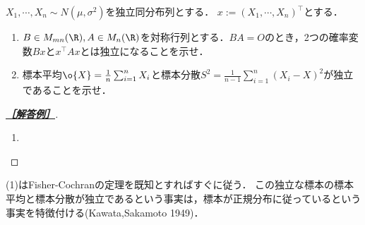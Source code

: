 \documentclass[uplatex,dvipdfmx]{jsarticle}
\begin{document}
\begin{tcolorbox}[colframe=ForestGreen, colback=ForestGreen!10!white,breakable,colbacktitle=ForestGreen!40!white,coltitle=black,fonttitle=\bfseries\sffamily,
    title=第３問]
    $X_1,\cdots,X_n\sim N(\mu,\sigma^2)$を独立同分布列とする．
    $x:=(X_1,\cdots,X_n)^\top$とする．
    \begin{enumerate}
        \item $B\in M_{mn}(\R),A\in M_n(\R)$を対称行列とする．$BA=O$のとき，2つの確率変数$Bx$と$x^\top Ax$とは独立になることを示せ．
        \item 標本平均$\o{X}=\frac{1}{n}\sum_{i=1}^nX_i$と標本分散$S^2=\frac{1}{n-1}\sum_{i=1}^n(X_i-X)^2$が独立であることを示せ．
    \end{enumerate}
\end{tcolorbox}
\begin{proof}[\textbf{\underline{［解答例］}}]\mbox{}
    \begin{enumerate}
        \item 
    \end{enumerate}
\end{proof}
\begin{remarks*}
    (1)はFisher-Cochranの定理を既知とすればすぐに従う．
    この独立な標本の標本平均と標本分散が独立であるという事実は，標本が正規分布に従っているという事実を特徴付ける(Kawata,Sakamoto 1949)．
\end{remarks*}
\end{document}
